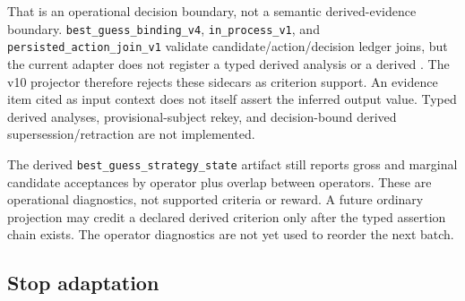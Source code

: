 \documentclass[11pt]{article}
\newcommand{\code}[1]{\path{#1}}
\newcommand{\action}[1]{\texttt{#1}}
\begin{document}
That is an operational decision boundary, not a semantic derived-evidence
boundary.  \action{best\_guess\_binding\_v4},
\action{in\_process\_v1}, and \action{persisted\_action\_join\_v1} validate
candidate/action/decision ledger joins, but the current adapter does not
register a typed derived analysis or a derived \code{FieldAssertion}.  The v10
projector therefore rejects these sidecars as criterion support.  An evidence
item cited as input context does not itself assert the inferred output value.
Typed derived analyses, provisional-subject rekey, and decision-bound derived
supersession/retraction are not implemented.

The derived \action{best\_guess\_strategy\_state} artifact still reports gross
and marginal candidate acceptances by operator plus overlap between operators.
These are operational diagnostics, not supported criteria or reward.  A future
ordinary projection may credit a declared derived criterion only after the
typed assertion chain exists.  The operator diagnostics are not yet used to
reorder the next batch.

\subsection{Stop adaptation}
\end{document}
